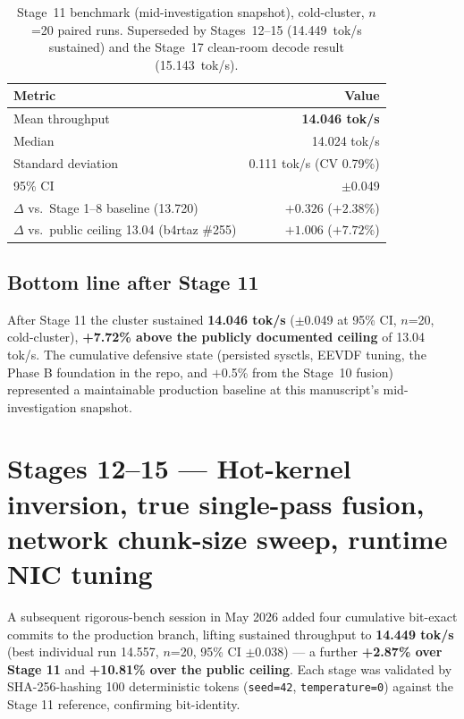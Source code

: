 \documentclass[10pt,a4paper]{article}
\begin{document}
\begin{table}[H]
\centering
\small
\caption{Stage~11 benchmark (mid-investigation snapshot), cold-cluster, $n$=20 paired runs. Superseded by Stages~12--15 (14.449~tok/s sustained) and the Stage~17 clean-room decode result (15.143~tok/s).}
\begin{tabular}{lr}
\toprule
\textbf{Metric} & \textbf{Value} \\
\midrule
Mean throughput & \textbf{14.046 tok/s} \\
Median            & 14.024 tok/s \\
Standard deviation & 0.111 tok/s (CV 0.79\%) \\
95\% CI           & $\pm$0.049 \\
\midrule
$\Delta$ vs.\ Stage 1--8 baseline (13.720) & $+0.326$ ($+2.38\%$) \\
$\Delta$ vs.\ public ceiling 13.04 (b4rtaz \#255) & $+1.006$ ($+7.72\%$) \\
\bottomrule
\end{tabular}
\end{table}

\subsection{Bottom line after Stage 11}

After Stage 11 the cluster sustained \textbf{14.046 tok/s} ($\pm$0.049 at 95\% CI, $n$=20, cold-cluster), \textbf{+7.72\% above the publicly documented ceiling} of 13.04 tok/s. The cumulative defensive state (persisted sysctls, EEVDF tuning, the Phase B foundation in the repo, and $+$0.5\% from the Stage~10 fusion) represented a maintainable production baseline at this manuscript's mid-investigation snapshot.

\section{Stages 12--15 --- Hot-kernel inversion, true single-pass fusion, network chunk-size sweep, runtime NIC tuning}

A subsequent rigorous-bench session in May 2026 added four cumulative bit-exact commits to the production branch, lifting sustained throughput to \textbf{14.449 tok/s} (best individual run 14.557, $n$=20, 95\% CI $\pm$0.038) --- a further \textbf{+2.87\% over Stage 11} and \textbf{+10.81\% over the public ceiling}. Each stage was validated by SHA-256-hashing 100 deterministic tokens (\texttt{seed=42}, \texttt{temperature=0}) against the Stage 11 reference, confirming bit-identity.
\end{document}
